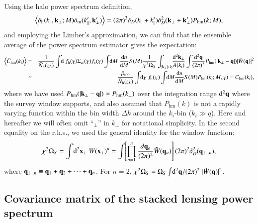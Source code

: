 \documentclass[onecolumn,notitlepage,showpacs,amsmath,amssymb,prd,floatfix]{revtex4-1}
\def\ave#1{\left\langle #1 \right\rangle}
\newcommand{\bx}{{\bf x}}
\newcommand{\bk}{{\bf k}}
\newcommand{\btheta}{{\bm{\theta}}}
\newcommand{\bq}{{\bf q}}
\newcommand{\tW}{\tilde{W}}
\newcommand{\dr}{\mathrm{d}}
\newcommand{\deltam}{\delta_{\mathrm{m}}}
\newcommand{\deltah}{\delta_{\mathrm{h}}}
\newcommand{\phm}{P_{\mathrm{hm}}}
\newcommand{\chm}{C_{\mathrm{hm}}}
\newcommand{\hchm}{\hat{C}_{\mathrm{hm}}}
\newcommand{\bnh}{\frac{\dr n}{\dr M}}
\newcommand{\sigmacr}{\Sigma_{\rm cr}}
\newcommand{\bNh}{\bar{N}_{\rm h}}
\begin{document}
Using the halo power spectrum definition,
%
\begin{equation}
 \ave{\deltah(k_\parallel,\bk_\perp;M)\deltam(k'_\parallel,\bk'_{\perp})}=(2\pi)^3
  \delta_D(k_\parallel+k'_\parallel)\delta_D^2(\bk_\perp+\bk'_\perp)\phm(k;M), 
\end{equation}
%
and employing the Limber's approximation, we can find that the ensemble
average of the power spectrum estimator gives the expectation:
%
\begin{eqnarray}
\ave{\hchm(k_i)}&=&\frac{1}{\bNh(z_L)}\int\!\!\dr~f_{\rm
 h}(\chi)\sigmacr(\chi)f_\kappa(\chi)\int\!\!\dr M~\bnh S(M)
 \frac{1}{\chi^2\Omega_S}\int_{|\bk_\perp|\in
 k_i}\!\!\frac{\dr^2\bk_\perp}{A(k_i)}
 \int\!\!\frac{\dr^2\bq}{(2\pi)^2}\phm(|\bk_\perp-\bq|)|\tW(\bq)|^2\nonumber\\
 &\simeq& \frac{\bar{\rho}_{\rm m0}}{\bNh(z_L)}
  \int\!\!\dr\chi~f_{\rm h}(\chi)\int\!\!\dr M \bnh
  S(M)\phm(k_i;M,\chi)=\chm(k_i), 
\end{eqnarray}
%
where we have used $\phm(|\bk_\perp-\bq|)\simeq \phm(k_\perp)$ over the
integration range $\dr^2\bq$ where the survey window supports, and also
assumed that $\phm(k)$ is not a rapidly varying function within the bin
width $\Delta k$ around the $k_i$-bin ($k_i \gg q$).  Here and hereafter
we will often omit ``$_{\perp}$'' in $k_{\perp}$ for notational
simplicity.  In the second equality on the r.h.s., we used the general
identity for the window function:
%
\begin{equation}
 \chi^2\Omega_S=\int\!\dr^2\bx_\perp~ W(\bx_\perp)^n=
  \int\!\!\left[\prod_{a=1}^n\frac{d\bq_a}{(2\pi)^2}\tW(\bq_a)\right](2\pi)^2
  \delta_D^2(\bq_{1\dots n}),
\end{equation}
%
where $\bq_{1\dots n}\equiv \bq_1+\bq_2+\cdots+\bq_n$. For $n=2$,
$\chi^2\Omega_S=\Omega_S\int\!\dr^2\bq/(2\pi)^2 ~ |\tW(\bq)|^2$.
%

\subsection{Covariance matrix of the stacked lensing power spectrum}
\end{document}
